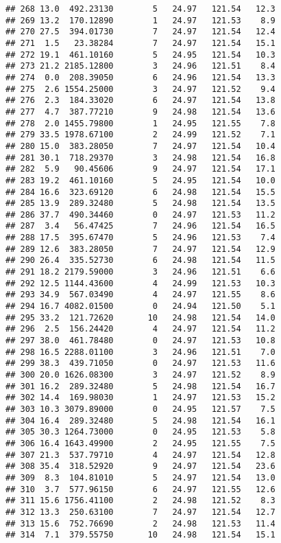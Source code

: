 \documentclass[
]{article}
\begin{document}
\begin{verbatim}
## 268 13.0  492.23130        5   24.97   121.54   12.3
## 269 13.2  170.12890        1   24.97   121.53    8.9
## 270 27.5  394.01730        7   24.97   121.54   12.4
## 271  1.5   23.38284        7   24.97   121.54   15.1
## 272 19.1  461.10160        5   24.95   121.54   10.3
## 273 21.2 2185.12800        3   24.96   121.51    8.4
## 274  0.0  208.39050        6   24.96   121.54   13.3
## 275  2.6 1554.25000        3   24.97   121.52    9.4
## 276  2.3  184.33020        6   24.97   121.54   13.8
## 277  4.7  387.77210        9   24.98   121.54   13.6
## 278  2.0 1455.79800        1   24.95   121.55    7.8
## 279 33.5 1978.67100        2   24.99   121.52    7.1
## 280 15.0  383.28050        7   24.97   121.54   10.4
## 281 30.1  718.29370        3   24.98   121.54   16.8
## 282  5.9   90.45606        9   24.97   121.54   17.1
## 283 19.2  461.10160        5   24.95   121.54   10.0
## 284 16.6  323.69120        6   24.98   121.54   15.5
## 285 13.9  289.32480        5   24.98   121.54   13.5
## 286 37.7  490.34460        0   24.97   121.53   11.2
## 287  3.4   56.47425        7   24.96   121.54   16.5
## 288 17.5  395.67470        5   24.96   121.53    7.4
## 289 12.6  383.28050        7   24.97   121.54   12.9
## 290 26.4  335.52730        6   24.98   121.54   11.5
## 291 18.2 2179.59000        3   24.96   121.51    6.6
## 292 12.5 1144.43600        4   24.99   121.53   10.3
## 293 34.9  567.03490        4   24.97   121.55    8.6
## 294 16.7 4082.01500        0   24.94   121.50    5.1
## 295 33.2  121.72620       10   24.98   121.54   14.0
## 296  2.5  156.24420        4   24.97   121.54   11.2
## 297 38.0  461.78480        0   24.97   121.53   10.8
## 298 16.5 2288.01100        3   24.96   121.51    7.0
## 299 38.3  439.71050        0   24.97   121.53   11.6
## 300 20.0 1626.08300        3   24.97   121.52    8.9
## 301 16.2  289.32480        5   24.98   121.54   16.7
## 302 14.4  169.98030        1   24.97   121.53   15.2
## 303 10.3 3079.89000        0   24.95   121.57    7.5
## 304 16.4  289.32480        5   24.98   121.54   16.1
## 305 30.3 1264.73000        0   24.95   121.53    5.8
## 306 16.4 1643.49900        2   24.95   121.55    7.5
## 307 21.3  537.79710        4   24.97   121.54   12.8
## 308 35.4  318.52920        9   24.97   121.54   23.6
## 309  8.3  104.81010        5   24.97   121.54   13.0
## 310  3.7  577.96150        6   24.97   121.55   12.6
## 311 15.6 1756.41100        2   24.98   121.52    8.3
## 312 13.3  250.63100        7   24.97   121.54   12.7
## 313 15.6  752.76690        2   24.98   121.53   11.4
## 314  7.1  379.55750       10   24.98   121.54   15.1

\end{verbatim}
\end{document}

